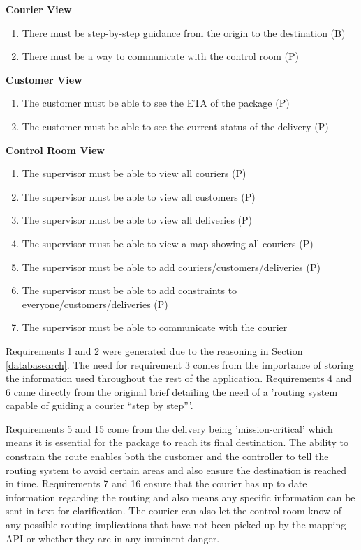 \textbf{Courier View}
\begin{enumerate}[resume]
\item There must be step-by-step guidance from the origin to the destination (B)
\item There must be a way to communicate with the control room (P)
\end{enumerate}

\textbf{Customer View}
\begin{enumerate}[resume]
\item The customer must be able to see the ETA of the package (P)
\item The customer must be able to see the current status of the delivery (P)
\end{enumerate}

\textbf{Control Room View}
\begin{enumerate}[resume]

\item The supervisor must be able to view all couriers (P)
\item The supervisor must be able to view all customers (P)
\item The supervisor must be able to view all deliveries (P)
\item The supervisor must be able to view a map showing all couriers (P)
\item The supervisor must be able to add couriers/customers/deliveries (P)
\item The supervisor must be able to add constraints to everyone/customers/deliveries (P)
\item The supervisor must be able to communicate with the courier

\end{enumerate}

Requirements 1 and 2 were generated due to the reasoning in Section \ref{databasearch}. The need for requirement 3 comes from the importance of storing the information used throughout the rest of the application. Requirements 4 and 6 came directly from the original brief detailing the need of a 'routing system capable of guiding a courier “step by step”'. 

Requirements 5 and 15 come from the delivery being 'mission-critical' which means it is essential for the package to reach its final destination. The ability to constrain the route enables both the customer and the controller to tell the routing system to avoid certain areas and also ensure the destination is reached in time. Requirements 7 and 16 ensure that the courier has up to date information regarding the routing and also means any specific information can be sent in text for clarification. The courier can also let the control room know of any possible routing implications that have not been picked up by the mapping API or whether they are in any imminent danger. 

